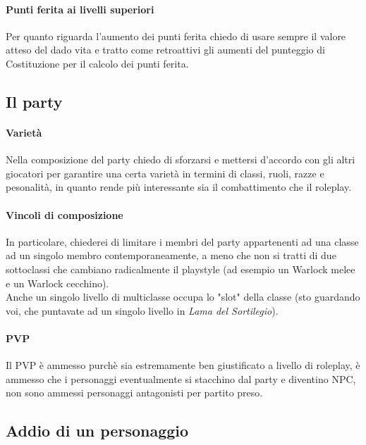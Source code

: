 \paragraph{Punti ferita ai livelli superiori}

Per quanto riguarda l'aumento dei punti ferita chiedo di usare sempre il valore atteso del dado vita e tratto come retroattivi gli aumenti del punteggio di Costituzione per il calcolo dei punti ferita.

\subsection{Il party}

\paragraph{Varietà}

Nella composizione del party chiedo di sforzarsi e mettersi d'accordo con gli altri giocatori per garantire una certa varietà in termini di classi, ruoli, razze e pesonalità, in quanto rende più interessante sia il combattimento che il roleplay.

\paragraph{Vincoli di composizione}

In particolare, chiederei di limitare i membri del party appartenenti ad una classe ad un singolo membro contemporaneamente, a meno che non si tratti di due sottoclassi che cambiano radicalmente il playstyle (ad esempio un Warlock melee e un Warlock cecchino). \\ Anche un singolo livello di multiclasse occupa lo "slot" della classe (sto guardando voi, che puntavate ad un singolo livello in \textit{Lama del Sortilegio}).

\paragraph{PVP}

Il PVP è ammesso purchè sia estremamente ben giustificato a livello di roleplay, è ammesso che i personaggi eventualmente si stacchino dal party e diventino NPC, non sono ammessi personaggi antagonisti per partito preso.

\subsection{Addio di un personaggio}

